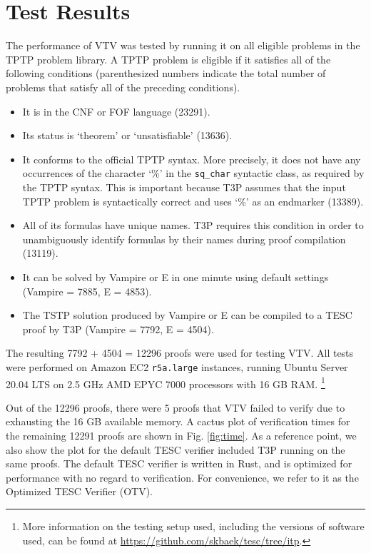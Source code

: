 \documentclass[12pt]{article}
\begin{document}
\section{Test Results} \label{sec:test-results}

The performance of VTV was tested by running it on all eligible problems 
in the TPTP \cite{sutcliffe2009tptp} problem library. A TPTP problem is eligible if it 
satisfies all of the following conditions (parenthesized numbers indicate 
the total number of problems that satisfy all of the preceding conditions).
\begin{itemize}
  \item It is in the CNF or FOF language (23291). 
  \item Its status is `theorem' or `unsatisfiable' (13636).
  \item It conforms to the official TPTP syntax. More precisely, 
    it does not have any occurrences of the character `\%' in the 
    \verb|sq_char| syntactic class, as required by the TPTP syntax.
    This is important because T3P assumes that the input TPTP problem 
    is syntactically correct and uses `\%' as an endmarker (13389).
  \item All of its formulas have unique names. T3P requires this condition 
    in order to unambiguously identify formulas by their names during 
    proof compilation (13119).
  \item It can be solved by Vampire or E in one minute using 
    default settings (Vampire = 7885, E = 4853).
  \item The TSTP solution produced by Vampire or E can be compiled to 
    a TESC proof by T3P (Vampire = 7792, E = 4504).
\end{itemize}
The resulting 7792 + 4504 = 12296 proofs were used for testing VTV.
All tests were performed on Amazon EC2 \texttt{r5a.large} instances, 
running Ubuntu Server 20.04 LTS on 2.5 GHz AMD EPYC 7000 processors with 
16 GB RAM. 
\footnote{
  More information on the testing setup used, including the versions of 
  software used, can be found at \url{https://github.com/skbaek/tesc/tree/itp}.
}

Out of the 12296 proofs, there were 5 proofs that VTV failed to verify 
due to exhausting the 16 GB available memory. A cactus plot of verification 
times for the remaining 12291 proofs are shown in Fig. \ref{fig:time}. 
As a reference point, we also show the plot for the default TESC verifier 
included T3P running on the same proofs. The default TESC verifier 
is written in Rust, and is optimized for performance with no regard to 
verification. For convenience, we refer to it as the Optimized TESC Verifier (OTV).
\end{document}
